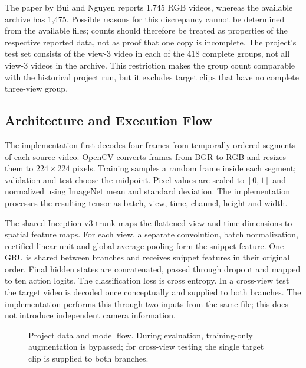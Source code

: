 \documentclass[runningheads]{llncs}
\begin{document}
The paper by Bui and Nguyen reports 1,745 RGB videos, whereas the available archive has 1,475. Possible reasons for this discrepancy cannot be determined from the available files; counts should therefore be treated as properties of the respective reported data, not as proof that one copy is incomplete. The project's test set consists of the view-3 video in each of the 418 complete groups, not all view-3 videos in the archive. This restriction makes the group count comparable with the historical project run, but it excludes target clips that have no complete three-view group.

\subsection{Architecture and Execution Flow}
The implementation first decodes four frames from temporally ordered segments of each source video. OpenCV converts frames from BGR to RGB and resizes them to $224\times224$ pixels. Training samples a random frame inside each segment; validation and test choose the midpoint. Pixel values are scaled to $[0,1]$ and normalized using ImageNet mean and standard deviation. The implementation processes the resulting tensor as batch, view, time, channel, height and width.

The shared Inception-v3 trunk maps the flattened view and time dimensions to spatial feature maps. For each view, a separate convolution, batch normalization, rectified linear unit and global average pooling form the snippet feature. One GRU is shared between branches and receives snippet features in their original order. Final hidden states are concatenated, passed through dropout and mapped to ten action logits. The classification loss is cross entropy. In a cross-view test the target video is decoded once conceptually and supplied to both branches. The implementation performs this through two inputs from the same file; this does not introduce independent camera information.

\begin{figure}[t]
\centering
{}
\caption{Project data and model flow. During evaluation, training-only augmentation is bypassed; for cross-view testing the single target clip is supplied to both branches.}
\label{fig:flow}
\end{figure}
\end{document}
